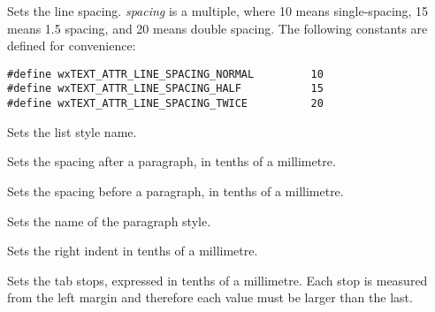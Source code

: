 Sets the line spacing. {\it spacing} is a multiple, where 10 means single-spacing,
15 means 1.5 spacing, and 20 means double spacing. The following constants are
defined for convenience:

{\small
\begin{verbatim}
#define wxTEXT_ATTR_LINE_SPACING_NORMAL         10
#define wxTEXT_ATTR_LINE_SPACING_HALF           15
#define wxTEXT_ATTR_LINE_SPACING_TWICE          20
\end{verbatim}
}

\label{wxrichtextattrsetliststylename}


Sets the list style name.

\label{wxrichtextattrsetparagraphspacingafter}


Sets the spacing after a paragraph, in tenths of a millimetre.

\label{wxrichtextattrsetparagraphspacingbefore}


Sets the spacing before a paragraph, in tenths of a millimetre.

\label{wxrichtextattrsetparagraphstylename}


Sets the name of the paragraph style.

\label{wxrichtextattrsetrightindent}


Sets the right indent in tenths of a millimetre.

\label{wxrichtextattrsettabs}


Sets the tab stops, expressed in tenths of a millimetre.
Each stop is measured from the left margin and therefore each value must be larger than the last.

\label{wxrichtextattrsettextcolour}

